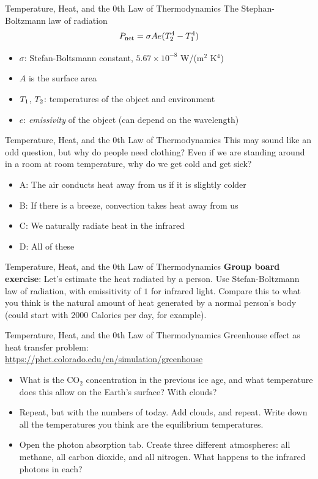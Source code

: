 \documentclass{beamer}
\begin{document}
\begin{frame}{Temperature, Heat, and the 0th Law of Thermodynamics}
\alert{The Stephan-Boltzmann} law of radiation
\begin{equation}
P_{\rm net} = \sigma A e (T_{\rm 2}^4 - T_{\rm 1}^4)
\end{equation}
\begin{itemize}
\item $\sigma$: Stefan-Boltsmann constant, $5.67 \times 10^{-8}$ W/(m$^2$ K$^4$)
\item $A$ is the surface area
\item $T_{\rm 1}$, $T_{\rm 2}$: temperatures of the object and environment
\item $e$: \textit{emissivity} of the object (can depend on the wavelength)
\end{itemize}
\end{frame}

\begin{frame}{Temperature, Heat, and the 0th Law of Thermodynamics}
This may sound like an odd question, but why do people need clothing?  Even if we are standing around in a room at room temperature, why do we get cold and get sick?
\begin{itemize}
\item A: The air conducts heat away from us if it is slightly colder
\item B: If there is a breeze, convection takes heat away from us
\item C: We naturally radiate heat in the infrared
\item D: All of these
\end{itemize}
\end{frame}

\begin{frame}{Temperature, Heat, and the 0th Law of Thermodynamics}
\textbf{Group board exercise}: Let's estimate the heat radiated by a person.  Use Stefan-Boltzmann law of radiation, with emissitivity of $1$ for infrared light.  Compare this to what you think is the natural amount of heat generated by a normal person's body (could start with 2000 Calories per day, for example).
\end{frame}

\begin{frame}{Temperature, Heat, and the 0th Law of Thermodynamics}
\small
Greenhouse effect as heat transfer problem: \\ \url{https://phet.colorado.edu/en/simulation/greenhouse}
\begin{itemize}
\item What is the CO$_2$ concentration in the previous ice age, and what temperature does this allow on the Earth's surface?  With clouds?
\item Repeat, but with the numbers of today.  Add clouds, and repeat.  Write down all the temperatures you think are the equilibrium temperatures.
\item Open the photon absorption tab.  Create three different atmospheres: all methane, all carbon dioxide, and all nitrogen.  What happens to the infrared photons in each?
\end{itemize}
\end{frame}
\end{document}
